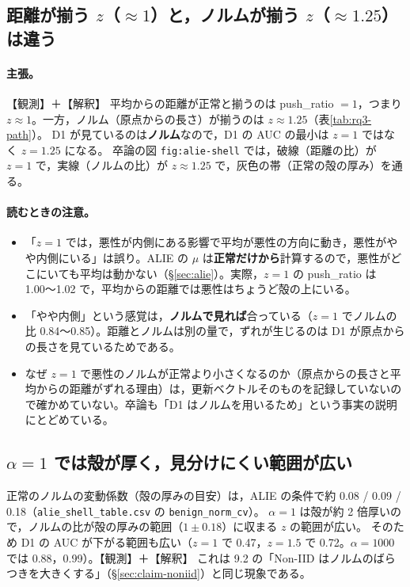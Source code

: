 \documentclass[a4j, dvipdfmx]{jsarticle}  %
\begin{document}
\subsection{距離が揃う $z$（$\approx 1$）と，ノルムが揃う $z$（$\approx 1.25$）は違う}
\label{sec:claim-rq3-norm}

\paragraph{主張。}【観測】＋【解釈】
平均からの距離が正常と揃うのは push\_ratio $= 1$，つまり $z \approx 1$。一方，ノルム（原点からの長さ）が揃うのは $z \approx 1.25$（表\ref{tab:rq3-path}）。
D1 が見ているのは\textbf{ノルム}なので，D1 の AUC の最小は $z = 1$ ではなく $z = 1.25$ になる。
卒論の図 \texttt{fig:alie-shell} では，破線（距離の比）が $z = 1$ で，実線（ノルムの比）が $z \approx 1.25$ で，灰色の帯（正常の殻の厚み）を通る。

\paragraph{読むときの注意。}
\begin{itemize}
  \item 「$z = 1$ では，悪性が内側にある影響で平均が悪性の方向に動き，悪性がやや内側にいる」は誤り。ALIE の $\mu$ は\textbf{正常だけから}計算するので，悪性がどこにいても平均は動かない（\S\ref{sec:alie}）。実際，$z = 1$ の push\_ratio は 1.00〜1.02 で，平均からの距離では悪性はちょうど殻の上にいる。
  \item 「やや内側」という感覚は，\textbf{ノルムで見れば}合っている（$z = 1$ でノルムの比 0.84〜0.85）。距離とノルムは別の量で，ずれが生じるのは D1 が原点からの長さを見ているためである。
  \item なぜ $z = 1$ で悪性のノルムが正常より小さくなるのか（原点からの長さと平均からの距離がずれる理由）は，更新ベクトルそのものを記録していないので確かめていない。卒論も「D1 はノルムを用いるため」という事実の説明にとどめている。
\end{itemize}

\subsection{$\alpha = 1$ では殻が厚く，見分けにくい範囲が広い}
\label{sec:claim-rq3-alpha}

正常のノルムの変動係数（殻の厚みの目安）は，ALIE の条件で約 0.08 / 0.09 / 0.18（\texttt{alie\_shell\_table.csv} の \texttt{benign\_norm\_cv}）。
$\alpha = 1$ は殻が約 2 倍厚いので，ノルムの比が殻の厚みの範囲（$1 \pm 0.18$）に収まる $z$ の範囲が広い。
そのため D1 の AUC が下がる範囲も広い（$z = 1$ で 0.47，$z = 1.5$ で 0.72。$\alpha = 1000$ では 0.88，0.99）。【観測】＋【解釈】
これは 9.2 の「Non-IID はノルムのばらつきを大きくする」（\S\ref{sec:claim-noniid}）と同じ現象である。
\end{document}
